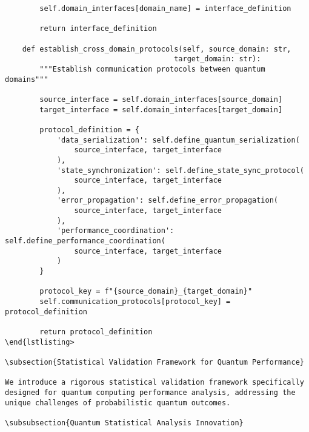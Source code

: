 \documentclass[12pt,a4paper]{report}
\begin{document}
\begin{lstlisting}
        self.domain_interfaces[domain_name] = interface_definition

        return interface_definition

    def establish_cross_domain_protocols(self, source_domain: str,
                                       target_domain: str):
        """Establish communication protocols between quantum domains"""

        source_interface = self.domain_interfaces[source_domain]
        target_interface = self.domain_interfaces[target_domain]

        protocol_definition = {
            'data_serialization': self.define_quantum_serialization(
                source_interface, target_interface
            ),
            'state_synchronization': self.define_state_sync_protocol(
                source_interface, target_interface
            ),
            'error_propagation': self.define_error_propagation(
                source_interface, target_interface
            ),
            'performance_coordination': self.define_performance_coordination(
                source_interface, target_interface
            )
        }

        protocol_key = f"{source_domain}_{target_domain}"
        self.communication_protocols[protocol_key] = protocol_definition

        return protocol_definition
\end{lstlisting>

\subsection{Statistical Validation Framework for Quantum Performance}

We introduce a rigorous statistical validation framework specifically designed for quantum computing performance analysis, addressing the unique challenges of probabilistic quantum outcomes.

\subsubsection{Quantum Statistical Analysis Innovation}


\end{lstlisting}
\end{document}
